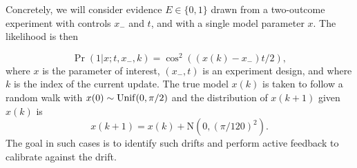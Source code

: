 \documentclass[twoside]{article}
\newcommand{\app}[1]{\hyperref[app:#1]{Appendix~\ref*{app:#1}}}
\newcommand{\fig}[1]{\hyperref[fig:#1]{Figure~\ref*{fig:#1}}}
\newcommand{\CRej}{\text{rejection filtering}}
\newcommand{\NN}{\mathrm{N}}
\begin{document}
Concretely, we will consider evidence $E\in\{0, 1\}$ drawn from a two-outcome
experiment with controls $x_-$ and $t$, and with a single model parameter $x$.
The likelihood is then
%
%
%
%
%

\begin{equation}
 \Pr(1 | x; t, x_-,k) = \cos^2((x(k) - x_-) t / 2),
\end{equation}
where $x$ is the parameter of interest, $(x_-, t)$ is an experiment design,
and where $k$ is the index of the current update.  The true model $x(k)$ is taken to
follow a random walk with $x(0)\sim {\rm Unif}(0,\pi/2)$ and the distribution
of $x(k+1)$ given $x(k)$ is
\begin{equation}
    x(k+1)=x(k) + \NN(0,(\pi/120)^2).
\end{equation}
The goal in such cases is to identify such drifts and perform active feedback to calibrate
against the drift.
\end{document}
